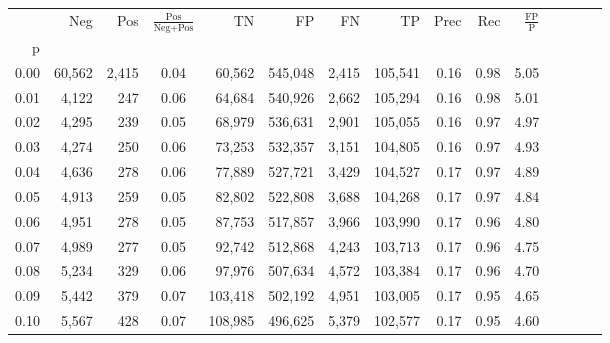 \begin{tabular}{rrrcrrrrrrrrrrr}
\toprule
{} &     Neg &     Pos & $\frac{\text{Pos}}{\text{Neg}+\text{Pos}}$ &       TN &       FP &       FN &       TP &  Prec &   Rec & $\frac{\text{FP}}{\text{P}}$ \\
p    &         &         &                                            &          &          &          &          &       &       &                              \\
\midrule
0.00 &  60,562 &   2,415 &                                       0.04 &   60,562 &  545,048 &    2,415 &  105,541 &  0.16 &  0.98 &                         5.05 \\
0.01 &   4,122 &     247 &                                       0.06 &   64,684 &  540,926 &    2,662 &  105,294 &  0.16 &  0.98 &                         5.01 \\
0.02 &   4,295 &     239 &                                       0.05 &   68,979 &  536,631 &    2,901 &  105,055 &  0.16 &  0.97 &                         4.97 \\
0.03 &   4,274 &     250 &                                       0.06 &   73,253 &  532,357 &    3,151 &  104,805 &  0.16 &  0.97 &                         4.93 \\
0.04 &   4,636 &     278 &                                       0.06 &   77,889 &  527,721 &    3,429 &  104,527 &  0.17 &  0.97 &                         4.89 \\
0.05 &   4,913 &     259 &                                       0.05 &   82,802 &  522,808 &    3,688 &  104,268 &  0.17 &  0.97 &                         4.84 \\
0.06 &   4,951 &     278 &                                       0.05 &   87,753 &  517,857 &    3,966 &  103,990 &  0.17 &  0.96 &                         4.80 \\
0.07 &   4,989 &     277 &                                       0.05 &   92,742 &  512,868 &    4,243 &  103,713 &  0.17 &  0.96 &                         4.75 \\
0.08 &   5,234 &     329 &                                       0.06 &   97,976 &  507,634 &    4,572 &  103,384 &  0.17 &  0.96 &                         4.70 \\
0.09 &   5,442 &     379 &                                       0.07 &  103,418 &  502,192 &    4,951 &  103,005 &  0.17 &  0.95 &                         4.65 \\
0.10 &   5,567 &     428 &                                       0.07 &  108,985 &  496,625 &    5,379 &  102,577 &  0.17 &  0.95 &                         4.60 \\

\end{tabular}
